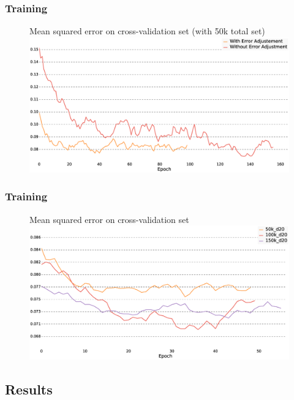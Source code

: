 \documentclass[bigger]{beamer}
\begin{document}
\begin{frame}
\frametitle{Training}
  \justifying
\begin{figure}[h]
\centering
   Mean squared error on cross-validation set (with 50k total set)\\
   \includegraphics[width=\textwidth]{Graphics/cross_validation_fnn_unadj_vs_adj_error.eps}
\end{figure}
\end{frame}

\begin{frame}
\frametitle{Training}
  \justifying
\begin{figure}[h]
\centering
   Mean squared error on cross-validation set\\
   \includegraphics[width=\textwidth]{Graphics/adj_error_s_cross_validation_fnn.eps}
\end{figure}
\end{frame}


\subsection{Results}
\end{document}
